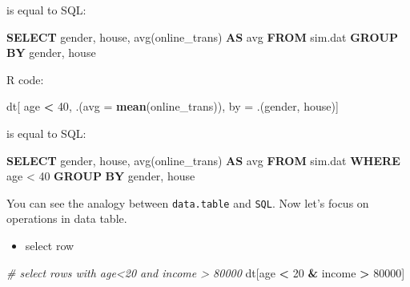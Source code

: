 \documentclass[12pt,]{krantz}
\makeatletter
\newenvironment{Shaded}{\begin{snugshade}}{\end{snugshade}}
\newcommand{\CommentTok}[1]{\textcolor[rgb]{0.37,0.37,0.37}{\textit{#1}}}
\newcommand{\DataTypeTok}[1]{\textcolor[rgb]{0.27,0.27,0.27}{#1}}
\newcommand{\DecValTok}[1]{\textcolor[rgb]{0.06,0.06,0.06}{#1}}
\newcommand{\FunctionTok}[1]{\textcolor[rgb]{0,0,0}{#1}}
\newcommand{\KeywordTok}[1]{\textcolor[rgb]{0.27,0.27,0.27}{\textbf{#1}}}
\newcommand{\NormalTok}[1]{#1}
\newcommand{\OperatorTok}[1]{\textcolor[rgb]{0.43,0.43,0.43}{\textbf{#1}}}
\newcommand{\StringTok}[1]{\textcolor[rgb]{0.5,0.5,0.5}{#1}}
\providecommand{\tightlist}{%
  \setlength{\itemsep}{0pt}\setlength{\parskip}{0pt}}
\newenvironment{kframe}{%
\medskip{}
\setlength{\fboxsep}{.8em}
 \def\at@end@of@kframe{}%
 \ifinner\ifhmode%
  \def\at@end@of@kframe{\end{minipage}}%
  \begin{minipage}{\columnwidth}%
 \fi\fi%
 \def\FrameCommand##1{\hskip\@totalleftmargin \hskip-\fboxsep
 \colorbox{shadecolor}{##1}\hskip-\fboxsep
     \hskip-\linewidth \hskip-\@totalleftmargin \hskip\columnwidth}%
 \MakeFramed {\advance\hsize-\width
   \@totalleftmargin\z@ \linewidth\hsize
   \@setminipage}}%
 {\par\unskip\endMakeFramed%
 \at@end@of@kframe}
\renewenvironment{Shaded}{\begin{kframe}}{\end{kframe}}
\makeatother
\begin{document}
is equal to SQL:

\begin{Shaded}
\begin{Highlighting}[]
\KeywordTok{SELECT}
\NormalTok{   gender,}
\NormalTok{   house,}
   \FunctionTok{avg}\NormalTok{(online_trans) }\KeywordTok{AS} \FunctionTok{avg} 
\KeywordTok{FROM}
\NormalTok{   sim.dat }
\KeywordTok{GROUP} \KeywordTok{BY}
\NormalTok{   gender,}
\NormalTok{   house}
\end{Highlighting}
\end{Shaded}

R code:

\begin{Shaded}
\begin{Highlighting}[]
\NormalTok{dt[ age }\OperatorTok{<}\StringTok{ }\DecValTok{40}\NormalTok{, .(}\DataTypeTok{avg =} \KeywordTok{mean}\NormalTok{(online_trans)), by =}\StringTok{ }\NormalTok{.(gender, house)]}
\end{Highlighting}
\end{Shaded}

is equal to SQL:

\begin{Shaded}
\begin{Highlighting}[]
\KeywordTok{SELECT}
\NormalTok{   gender,}
\NormalTok{   house,}
   \FunctionTok{avg}\NormalTok{(online_trans) }\KeywordTok{AS} \FunctionTok{avg} 
\KeywordTok{FROM}
\NormalTok{   sim.dat }
\KeywordTok{WHERE}
\NormalTok{   age < }\DecValTok{40} 
\KeywordTok{GROUP} \KeywordTok{BY}
\NormalTok{   gender,}
\NormalTok{   house}
\end{Highlighting}
\end{Shaded}

You can see the analogy between \texttt{data.table} and \texttt{SQL}. Now let's focus on operations in data table.

\begin{itemize}
\tightlist
\item
  select row
\end{itemize}

\begin{Shaded}
\begin{Highlighting}[]
\CommentTok{# select rows with age<20 and income > 80000}
\NormalTok{dt[age }\OperatorTok{<}\StringTok{ }\DecValTok{20} \OperatorTok{&}\StringTok{ }\NormalTok{income }\OperatorTok{>}\StringTok{ }\DecValTok{80000}\NormalTok{]}
\end{Highlighting}
\end{Shaded}
\end{document}
